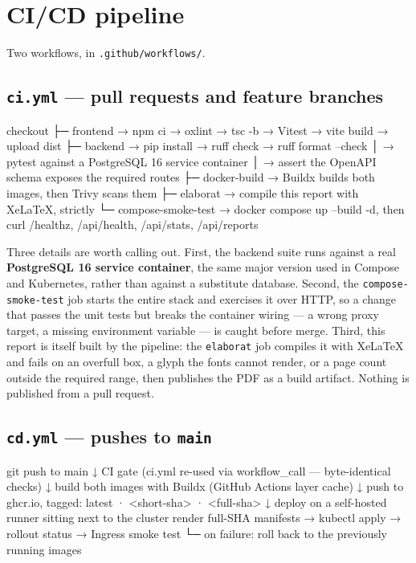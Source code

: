 \documentclass[10pt,a4paper]{article}
\newcommand{\cd}[1]{\texttt{\small #1}}
\begin{document}
\section{CI/CD pipeline}

Two workflows, in \cd{.github/workflows/}.

\subsection{\cd{ci.yml} --- pull requests and feature branches}

\begin{code}
checkout
  ├─ frontend  → npm ci → oxlint → tsc -b → Vitest → vite build → upload dist
  ├─ backend   → pip install → ruff check → ruff format --check
  │               → pytest against a PostgreSQL 16 service container
  │               → assert the OpenAPI schema exposes the required routes
  ├─ docker-build       → Buildx builds both images, then Trivy scans them
  ├─ elaborat           → compile this report with XeLaTeX, strictly
  └─ compose-smoke-test → docker compose up --build -d, then curl
                          /healthz, /api/health, /api/stats, /api/reports
\end{code}

Three details are worth calling out. First, the backend suite runs against a
real \textbf{PostgreSQL 16 service container}, the same major version used in
Compose and Kubernetes, rather than against a substitute database. Second, the
\cd{compose-smoke-test} job starts the entire stack and exercises it over
HTTP, so a change that passes the unit tests but breaks the container wiring
--- a wrong proxy target, a missing environment variable --- is caught before
merge. Third, this report is itself built by the pipeline: the \cd{elaborat}
job compiles it with XeLaTeX and fails on an overfull box, a glyph the fonts
cannot render, or a page count outside the required range, then publishes the
PDF as a build artifact. Nothing is published from a pull request.

\subsection{\cd{cd.yml} --- pushes to \cd{main}}

\begin{code}
git push to main
      ↓
CI gate  (ci.yml re-used via workflow_call — byte-identical checks)
      ↓
build both images with Buildx (GitHub Actions layer cache)
      ↓
push to ghcr.io, tagged:  latest · <short-sha> · <full-sha>
      ↓
deploy on a self-hosted runner sitting next to the cluster
  render full-SHA manifests → kubectl apply → rollout status → Ingress smoke test
  └─ on failure: roll back to the previously running images
\end{code}
\end{document}
